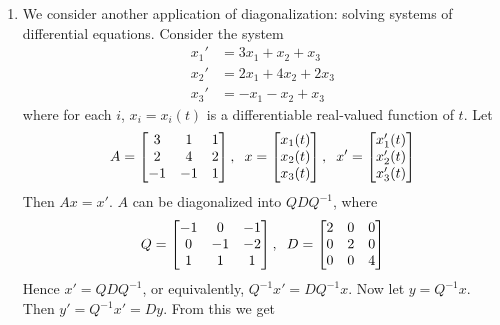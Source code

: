 \documentclass[10pt]{article}
\begin{document}
\begin{multicols*}{2}
\begin{enumerate}
\begin{enumerate}
        \item We consider another application of diagonalization: solving systems of differential equations. Consider the system
        \begin{align*}
            x_1' &= 3x_1 + x_2 + x_3 \\
            x_2' &= 2x_1 + 4x_2 + 2x_3 \\
            x_3' &= -x_1 - x_2 + x_3
        \end{align*}
        where for each $i$, $x_i = x_i(t)$ is a differentiable real-valued function of $t$. Let 
        \begin{align*}
            A = 
            \begin{bmatrix}
            3 & 1 & 1 \\
            2 & 4 & 2 \\
            -1 & -1 & 1
            \end{bmatrix}, \hspace{2mm}
            x = 
            \begin{bmatrix} 
            x_1(t) \\ x_2(t) \\ x_3(t)
            \end{bmatrix}, \hspace{2mm}
            x' = 
            \begin{bmatrix} 
            x_1'(t) \\ x_2'(t) \\ x_3'(t)
            \end{bmatrix}
        \end{align*}
        Then $Ax = x'$. $A$ can be diagonalized into $QDQ^{-1}$, where
        \begin{align*}
            Q = 
            \begin{bmatrix}
            -1 & 0 & -1 \\
            0 & -1 & -2 \\
            1 & 1 & 1
            \end{bmatrix}, \hspace{2mm}
            D = 
            \begin{bmatrix}
            2 & 0 & 0 \\
            0 & 2 & 0 \\
            0 & 0 & 4
            \end{bmatrix}
        \end{align*}
        Hence $x' = QDQ^{-1}$, or equivalently, $Q^{-1}x' = DQ^{-1}x$. Now let $y = Q^{-1}x$. Then $y' = Q^{-1}x' = Dy$. From this we get

\end{enumerate}
\end{enumerate}
\end{multicols*}
\end{document}
